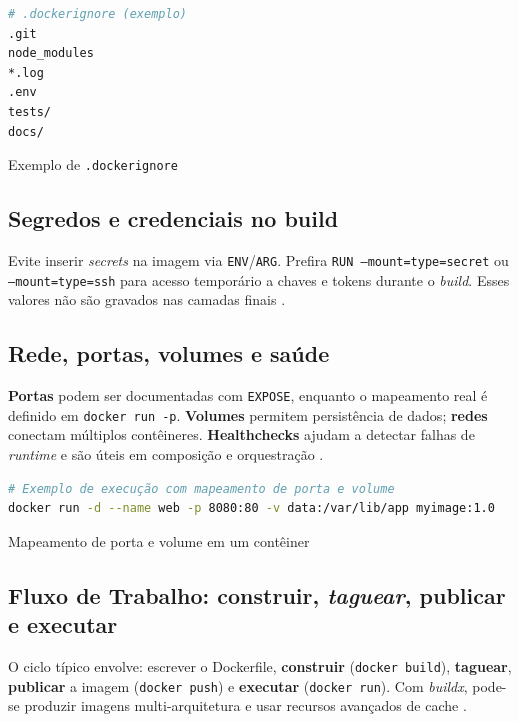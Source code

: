\begin{codigo}[H]
\begin{lstlisting}[language=bash]
# .dockerignore (exemplo)
.git
node_modules
*.log
.env
tests/
docs/
\end{lstlisting}
\caption{Exemplo de \texttt{.dockerignore}}
\label{lst:dockerignore}
\end{codigo}

\subsection{Segredos e credenciais no build}
\label{subsec:secrets}

Evite inserir \textit{secrets} na imagem via \texttt{ENV}/\texttt{ARG}. Prefira \texttt{RUN --mount=type=secret} ou \texttt{--mount=type=ssh} para acesso temporário a chaves e tokens durante o \textit{build}. Esses valores não são gravados nas camadas finais \cite{dockerfile_ref}. 

\subsection{Rede, portas, volumes e saúde}
\label{sec:network-storage}

\textbf{Portas} podem ser documentadas com \texttt{EXPOSE}, enquanto o mapeamento real é definido em \texttt{docker run -p}. \textbf{Volumes} permitem persistência de dados; \textbf{redes} conectam múltiplos contêineres. \textbf{Healthchecks} ajudam a detectar falhas de \textit{runtime} e são úteis em composição e orquestração \cite{dockerfile_ref,docker_overview}.

\begin{codigo}[H]
\begin{lstlisting}[language=bash]
# Exemplo de execução com mapeamento de porta e volume
docker run -d --name web -p 8080:80 -v data:/var/lib/app myimage:1.0
\end{lstlisting}
\caption{Mapeamento de porta e volume em um contêiner}
\label{lst:docker-run-ports-vol}
\end{codigo}

\subsection{Fluxo de Trabalho: construir, \textit{taguear}, publicar e executar}
\label{sec:workflow}

O ciclo típico envolve: escrever o Dockerfile, \textbf{construir} (\texttt{docker build}), \textbf{taguear}, \textbf{publicar} a imagem (\texttt{docker push}) e \textbf{executar} (\texttt{docker run}). Com \textit{buildx}, pode-se produzir imagens multi-arquitetura e usar recursos avançados de cache \cite{docker_overview,dockerfile_ref}.

